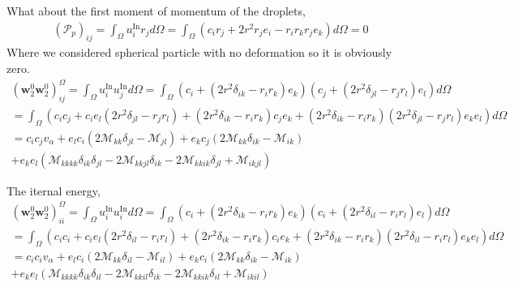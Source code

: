 What about the first moment of momentum of the droplets, 
\begin{align*}
    (\mathcal{P}_p)_{ij}
    = \int_{\Omega} 
    u_i^\text{In} r_j 
    d\Omega
    = \int_{\Omega} 
    (c_i r_j 
    + 2 r^2  r_j e_i - r_i r_k r_j e_k)
    d\Omega
    = 0 
\end{align*}
Where we considered spherical particle with no deformation so it is obviously zero.
\begin{align*}
    (\textbf{w}_2^0 \textbf{w}_2^0)_{ij}^\Omega
    = \int_{\Omega} 
    u_i^\text{In}u_j^\text{In}
    d\Omega
    = \int_{\Omega} 
    ( c_i + \left(2 r^2 \delta_{ik} - r_ir_k\right) e_k)
    ( c_j + \left(2 r^2 \delta_{jl} - r_jr_l\right) e_l)
    d\Omega\\
    = \int_{\Omega} 
    (c_i c_j + c_i e_l (2 r^2 \delta_{jl} - r_jr_l )
    + (2 r^2 \delta_{ik} - r_ir_k)c_j e_k
    +  (2 r^2 \delta_{ik} - r_ir_k)(2 r^2 \delta_{jl} - r_jr_l)e_ke_l
    )
    d\Omega\\
    = c_i c_j v_\alpha
    + e_l c_i (2 \mathcal{M}_{kk} \delta_{jl} - \mathcal{M}_{jl})
    + e_k c_j (2 \mathcal{M}_{kk} \delta_{ik} - \mathcal{M}_{ik})\\
    + e_ke_l (\mathcal{M}_{kkkk}\delta_{ik}\delta_{jl}
    -2\mathcal{M}_{kkjl}\delta_{ik}
    -2\mathcal{M}_{kkik}\delta_{jl}
    + \mathcal{M}_{ikjl}) 
\end{align*}

The iternal energy, 
\begin{align*}
    (\textbf{w}_2^0 \textbf{w}_2^0)_{ii}^\Omega
    = \int_{\Omega} 
    u_i^\text{In}u_i^\text{In}
    d\Omega
    = \int_{\Omega} 
    ( c_i + \left(2 r^2 \delta_{ik} - r_ir_k\right) e_k)
    ( c_i + \left(2 r^2 \delta_{il} - r_ir_l\right) e_l)
    d\Omega\\
    = \int_{\Omega} 
    (c_i c_i + c_i e_l (2 r^2 \delta_{il} - r_ir_l )
    + (2 r^2 \delta_{ik} - r_ir_k)c_i e_k
    +  (2 r^2 \delta_{ik} - r_ir_k)(2 r^2 \delta_{il} - r_ir_l)e_ke_l
    )
    d\Omega\\
    = c_i c_i v_\alpha
    + e_l c_i (2 \mathcal{M}_{kk} \delta_{il} - \mathcal{M}_{il})
    + e_k c_i (2 \mathcal{M}_{kk} \delta_{ik} - \mathcal{M}_{ik})\\
    + e_ke_l (\mathcal{M}_{kkkk}\delta_{ik}\delta_{il}
    -2\mathcal{M}_{kkil}\delta_{ik}
    -2\mathcal{M}_{kkik}\delta_{il}
    + \mathcal{M}_{ikil}) 
\end{align*}
